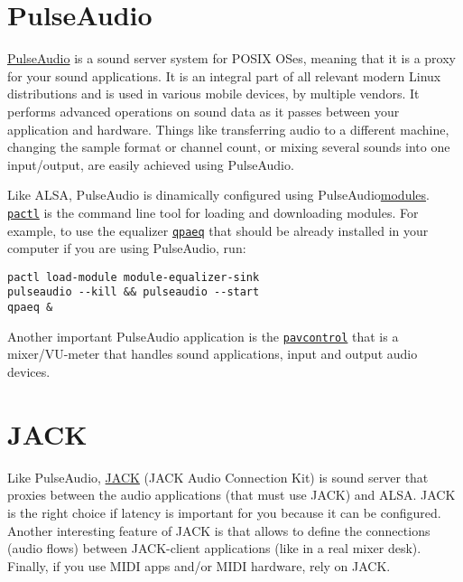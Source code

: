 \section{PulseAudio}

\href{https://www.freedesktop.org/wiki/Software/PulseAudio/}{PulseAudio}
  is a sound server system for POSIX OSes, meaning that it is a proxy
  for your sound applications. It is an integral part of all relevant
  modern Linux distributions and is used in various mobile devices, by
  multiple vendors. It performs advanced operations on sound data as
  it passes between your application and hardware. Things like
  transferring audio to a different machine, changing the sample
  format or channel count, or mixing several sounds into one
  input/output, are easily achieved using
  PulseAudio.~\cite{newmarch2017pulseaudio}

Like ALSA, PulseAudio is dinamically configured using
PulseAudio\href{https://www.freedesktop.org/wiki/Software/PulseAudio/Documentation/User/Modules/}{modules}. \texttt{\href{https://linux.die.net/man/1/pactl}{pactl}}
is the command line tool for loading and downloading modules. For
example, to use the equalizer
\texttt{\href{https://www.freedesktop.org/wiki/Software/PulseAudio/Documentation/User/Equalizer/}{qpaeq}}
that should be already installed in your computer if you are using
PulseAudio, run:

\begin{verbatim}
pactl load-module module-equalizer-sink
pulseaudio --kill && pulseaudio --start
qpaeq &
\end{verbatim}

Another important PulseAudio application is the
\texttt{\href{https://freedesktop.org/software/pulseaudio/pavucontrol/}{pavcontrol}}
that is a mixer/VU-meter that handles sound applications, input and
output audio devices.

\section{JACK}

Like PulseAudio, \href{http://jackaudio.org/}{JACK} (JACK Audio
Connection Kit) is sound server that proxies between the audio
applications (that must use JACK) and ALSA. JACK is the right choice
if latency is important for you because it can be configured. Another
interesting feature of JACK is that allows to define the connections
(audio flows) between JACK-client applications (like in a real mixer
desk). Finally, if you use MIDI apps and/or MIDI hardware, rely on
JACK.

